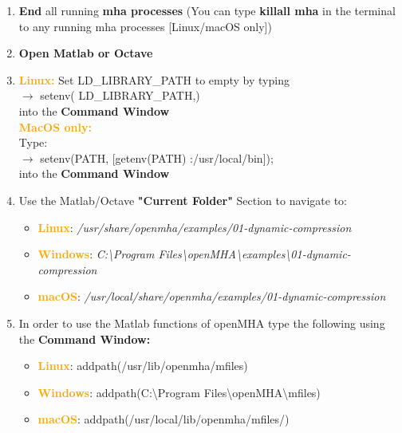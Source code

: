 \documentclass[11pt,a4paper,twoside]{article}
\newcommand{\+}{\discretionary{\mbox{\scriptsize$\hookleftarrow$}}{}{}}
\begin{document}
{{\begin{enumerate}
\item \textbf{End} all running \textbf{mha processes} (You can type \textbf{killall mha} in the terminal to any running mha processes [Linux/macOS only])
\item \textbf{Open Matlab or Octave}
\item \textcolor{orange}{\textbf{Linux:}} Set LD\_LIBRARY\_PATH to empty by typing \\ {\ttfamily
  $\rightarrow$ setenv(\textquotesingle
  LD\_LIBRARY\_PATH\textquotesingle,\textquotesingle\textquotesingle)} \\
  into the \textbf{Command Window} \\
\textcolor{orange}{\textbf{MacOS only:}} \\Type: \\{\ttfamily $\rightarrow$ setenv(\textquotesingle PATH\textquotesingle, [getenv(\textquotesingle PATH\textquotesingle) \textquotesingle :/usr/local/bin\textquotesingle]);} \\
into the \textbf{Command Window} \\  
\item Use the Matlab/Octave \textbf{"Current Folder"} Section to navigate to:

\begin{itemize}
\item \textcolor{orange}{\textbf{Linux}}: \textit{/usr/share/openmha/examples/01-dynamic-compression} 
\item \textcolor{orange}{\textbf{Windows}}: \textit{C:\textbackslash Program Files\textbackslash openMHA\textbackslash examples\textbackslash 01-dynamic-compression}
\item \textcolor{orange}{\textbf{macOS}}: \textit{/usr/local/share/openmha/examples/01-dynamic-compression} 
\end{itemize}

\item In order to use the Matlab functions of openMHA type the following using the \textbf{Command Window:} 

\begin{itemize}
\item \textcolor{orange}{\textbf{Linux}}: {\ttfamily addpath(\textquotesingle{}/usr/lib/openmha/mfiles\textquotesingle{})}
\item \textcolor{orange}{\textbf{Windows}}: {\ttfamily addpath(\textquotesingle{}C:\textbackslash Program Files\textbackslash openMHA\textbackslash mfiles\textquotesingle{})}
\item \textcolor{orange}{\textbf{macOS}}: {\ttfamily addpath(\textquotesingle{}/usr/local/lib/openmha/mfiles/\textquotesingle{})}
\end{itemize}



\end{enumerate}}}
\end{document}
